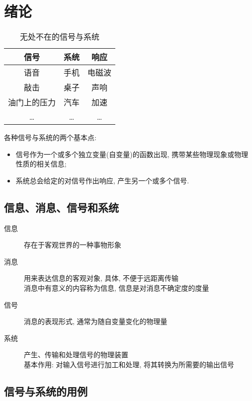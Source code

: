\section{绪论}

    \begin{table}[h] \centering
        \caption{无处不在的信号与系统}
        \label{tab:1:signals-and-systems-everywhere}
        \begin{tabular}{ccc} \toprule
            信号 & 系统 & 响应 \\ \midrule
            语音 & 手机 & 电磁波 \\
            敲击 & 桌子 & 声响 \\
            油门上的压力 & 汽车 & 加速 \\
            \ldots & \ldots & \ldots \\
            \bottomrule
        \end{tabular}
    \end{table}

    各种信号与系统的两个基本点:

    \begin{itemize}
        \item 信号作为一个或多个独立变量(自变量)的函数出现, 携带某些物理现象或物理性质的相关信息;
        \item 系统总会给定的对信号作出响应, 产生另一个或多个信号.
    \end{itemize}

    \subsection{信息、消息、信号和系统}

        \begin{description}
            \item[信息] 存在于客观世界的一种事物形象
            \item[消息] 用来表达信息的客观对象, 具体, 不便于远距离传输 \\
                消息中有意义的内容称为信息, 信息是对消息不确定度的度量
            \item[信号] 消息的表现形式, 通常为随自变量变化的物理量
            \item[系统] 产生、传输和处理信号的物理装置 \\
                基本作用: 对输入信号进行加工和处理, 将其转换为所需要的输出信号
        \end{description}

    \subsection{信号与系统的用例}

